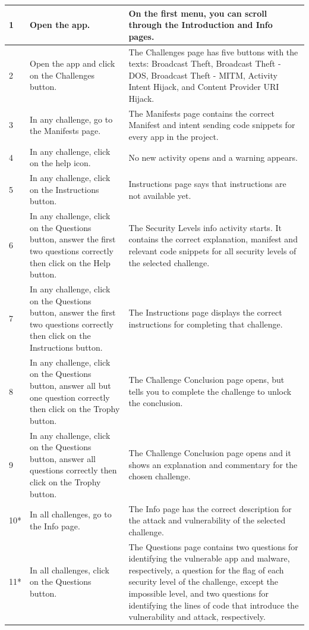 \begin{center}
\begin{longtable}{|p{0.4cm} |p{5.2cm} |p{7.4cm} |}
         \hline
         1 & Open the app. & On the first menu, you can scroll through the Introduction and Info pages. \\
         \hline
         2 & Open the app and click on the Challenges button. & The Challenges page has five buttons with the texts: Broadcast Theft, Broadcast Theft - DOS, Broadcast Theft - MITM, Activity Intent Hijack, and Content Provider URI Hijack. \\
         \hline
         3 & In any challenge, go to the Manifests page. & The Manifests page contains the correct Manifest and intent sending code snippets for every app in the project. \\
         \hline
         4 & In any challenge, click on the help icon. & No new activity opens and a warning appears. \\
         \hline
         5 & In any challenge, click on the Instructions button. & Instructions page says that instructions are not available yet.\\
         \hline
         6 & In any challenge, click on the Questions button, answer the first two questions correctly then click on the Help button. & The Security Levels info activity starts. It contains the correct explanation, manifest and relevant code snippets for all security levels of the selected challenge.\\
         \hline
         7 & In any challenge, click on the Questions button, answer the first two questions correctly then click on the Instructions button. & The Instructions page displays the correct instructions for completing that challenge.\\
         \hline
         8 & In any challenge, click on the Questions button, answer all but one question correctly then click on the Trophy button. & The Challenge Conclusion page opens, but tells you to complete the challenge to unlock the conclusion.\\
         \hline
         9 & In any challenge, click on the Questions button, answer all questions correctly then click on the Trophy button. & The Challenge Conclusion page opens and it shows an explanation and commentary for the chosen challenge.\\
         \hline
         10* & In all challenges, go to the Info page. & The Info page has the correct description for the attack and vulnerability of the selected challenge. \\
         \hline
         11* & In all challenges, click on the Questions button. & The Questions page contains two questions for identifying the vulnerable app and malware, respectively, a question for the flag of each security level of the challenge, except the impossible level, and two questions for identifying the lines of code that introduce the vulnerability and attack, respectively. \\

\end{longtable}
\end{center}
